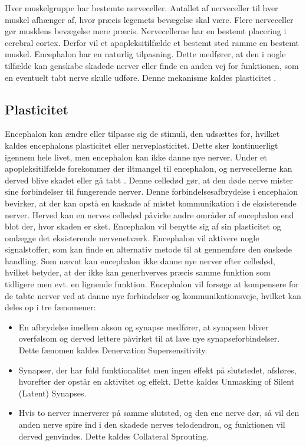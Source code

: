 Hver muskelgruppe har bestemte nerveceller. Antallet af nerveceller til hver muskel afhænger af, hvor præcis legemets bevægelse skal være. Flere nerveceller gør musklens bevægelse mere præcis. \cite{Stanfield2014} Nervecellerne har en bestemt placering i cerebral cortex. Derfor vil et apopleksitilfælde et bestemt sted ramme en bestemt muskel. Encephalon har en naturlig tilpasning. Dette medfører, at den i nogle tilfælde kan genskabe skadede nerver eller finde en anden vej for funktionen, som en eventuelt tabt nerve skulle udføre. \cite{Martini2012} Denne mekanisme kaldes plasticitet \cite{Ramanathan2006}. 

\subsection{Plasticitet}
Encephalon kan ændre eller tilpasse sig de stimuli, den udsættes for, hvilket kaldes encephalons plasticitet eller nerveplasticitet. Dette sker kontinuerligt igennem hele livet, men encephalon kan ikke danne nye nerver. \cite{Stanfield2014} Under et apopleksitilfælde forekommer der iltmangel til encephalon, og nervecellerne kan derved blive skadet eller gå tabt \cite{Schulze2011}. Denne celledød gør, at den døde nerve mister sine forbindelser til fungerende nerver. Denne forbindelsesafbrydelse i encephalon bevirker, at der kan opstå en kaskade af mistet kommunikation i de eksisterende nerver. Herved kan en nerves celledød påvirke andre områder af encephalon end blot der, hvor skaden er sket. \cite{Raine2009} Encephalon vil benytte sig af sin plasticitet og omlægge det eksisterende nervenetværk. Encephalon vil aktivere nogle signalstoffer, som kan finde en alternativ metode til at gennemføre den ønskede handling. \cite{Rugnett2015}  Som nævnt kan encephalon ikke danne nye nerver efter celledød, hvilket betyder, at der ikke kan generhverves præcis samme funktion som tidligere men evt. en lignende funktion. Encephalon vil forsøge at kompensere for de tabte nerver ved at danne nye forbindelser og kommunikationsveje, hvilket kan deles op i tre fænomener: \cite{Raine2009}

\begin{itemize}
	\item En afbrydelse imellem akson og synapse medfører, at synapsen bliver overfølsom og derved lettere påvirket til at lave nye synapseforbindelser. Dette fænomen kaldes Denervation Supersensitivity.
	\item Synapser, der har fuld funktionalitet men ingen effekt på slutstedet, afsløres, hvorefter der opstår en aktivitet og effekt. Dette kaldes Unmasking of Silent (Latent) Synapses.
	\item Hvis to nerver innerverer på samme slutsted, og den ene nerve dør, så vil den anden nerve spire ind i den skadede nerves telodendron, og funktionen vil derved genvindes. Dette kaldes Collateral Sprouting.
\end{itemize}

